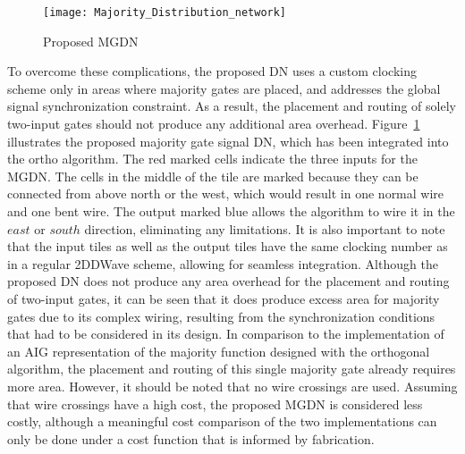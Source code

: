 
\begin{figure}
	\centering
	\texttt{[image: Majority\_Distribution\_network]}
	\caption{Proposed MGDN}\label{fig:QCA_Maj_nw}
\end{figure}


To overcome these complications, the proposed DN uses a custom clocking scheme only in areas where majority gates are placed, and addresses the global signal synchronization constraint. As a result, the placement and routing of solely two-input gates should not produce any additional area overhead. Figure~\ref{fig:QCA_Maj_nw} illustrates the proposed majority gate signal DN, which has been integrated into the ortho algorithm. The red marked cells indicate the three inputs for the MGDN. The cells in the middle of the tile are marked because they can be connected from above north or the west, which would result in one normal wire and one bent wire. The output marked blue allows the algorithm to wire it in the $east$ or $south$ direction, eliminating any limitations. It is also important to note that the input tiles as well as the output tiles have the same clocking number as in a regular 2DDWave scheme, allowing for seamless integration. Although the proposed DN does not produce any area overhead for the placement and routing of two-input gates, it can be seen that it does produce excess area for majority gates due to its complex wiring, resulting from the synchronization conditions that had to be considered in its design. In comparison to the implementation of an AIG representation of the majority function designed with the orthogonal algorithm, the placement and routing of this single majority gate already requires more area. However, it should be noted that no wire crossings are used. Assuming that wire crossings have a high cost, the proposed MGDN is considered less costly, although a meaningful cost comparison of the two implementations can only be done under a cost function that is informed by fabrication.

